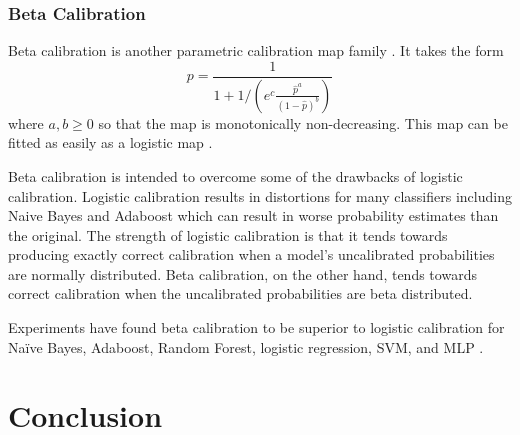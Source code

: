 % 

\subsubsection{Beta Calibration}

Beta calibration is another parametric calibration map family \cite{beyond_sigmoids}. It takes the form
\begin{equation}
	p = \frac{1}{1 + 1/\left(e^c\frac{\hat{p}^a}{(1-\hat{p})^b}\right) }
\end{equation}
where $a,b\ge 0$ so that the map is monotonically non-decreasing. This map can be fitted as easily as a logistic map \cite{beyond_sigmoids}.

Beta calibration is intended to overcome some of the drawbacks of logistic calibration. Logistic calibration results in distortions for many classifiers including Naive Bayes and Adaboost which can result in worse probability estimates than the original. The  strength of logistic calibration is that it tends towards producing exactly correct calibration when a model's uncalibrated probabilities are normally distributed. Beta calibration, on the other hand, tends towards correct calibration when the uncalibrated probabilities are beta distributed.

Experiments have found beta calibration to be superior to logistic calibration for Na\"{i}ve Bayes, Adaboost, Random Forest, logistic regression, SVM, and MLP \cite{beyond_sigmoids}. 


\section{Conclusion} \label{CDDM:conclusion}

